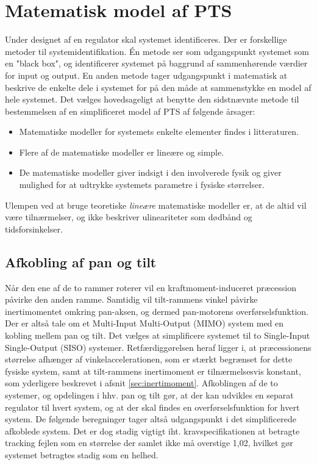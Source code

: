 \section{Matematisk model af PTS}
\label{sec:matPTS}
Under designet af en regulator skal systemet identificeres. Der er forskellige metoder til systemidentifikation.
Én metode ser som udgangspunkt systemet som en "black box", og identificerer systemet
på baggrund af sammenhørende værdier for input og output.
En anden metode tager udgangspunkt i matematisk at beskrive de enkelte dele i systemet
for på den måde at sammenstykke en model af hele systemet.
Det vælges hovedsageligt at benytte den sidstnævnte metode til bestemmelsen af en simplificeret
model af PTS af følgende årsager:
\begin{itemize}
\itemsep1pt
\item Matematiske modeller for systemets enkelte elementer findes i litteraturen.
\item Flere af de matematiske modeller er lineære og simple.
\item De matematiske modeller giver indsigt i den involverede fysik og giver mulighed
	for at udtrykke systemets parametre i fysiske størrelser.
\end{itemize}
Ulempen ved at bruge teoretiske \textit{lineære} matematiske modeller er,
at de altid vil være tilnærmelser, og ikke beskriver ulineariteter som dødbånd og tidsforsinkelser.

\subsection{Afkobling af pan og tilt}
Når den ene af de to rammer roterer vil en kraftmoment-induceret præcession påvirke den anden ramme.
Samtidig vil tilt-rammens vinkel påvirke inertimomentet omkring pan-aksen, og dermed
pan-motorens overførselsfunktion.
Der er altså tale om et Multi-Input Multi-Output (MIMO) system med en kobling mellem pan og tilt.
Det vælges at simplificere systemet til to Single-Input Single-Output (SISO) systemer.%
Retfærdiggørelsen heraf ligger i, at præcessionens størrelse afhænger af vinkelaccelerationen, som er stærkt begrænset
for dette fysiske system, samt at tilt-rammens inertimoment er tilnærmelsesvis konstant, som yderligere beskrevet i afsnit \ref{sec:inertimoment}.
Afkoblingen af de to systemer, og opdelingen i hhv. pan og tilt gør, at der kan udvikles en separat regulator
til hvert system, og at der skal findes en overførselsfunktion for hvert system.
De følgende beregninger tager altså udgangspunkt i det simplificerede afkoblede system.
Det er dog stadig vigtigt iht. kravspecifikationen at betragte tracking fejlen som en størrelse der samlet
ikke må overstige 1,02\degree{}, hvilket gør systemet betragtes stadig som en helhed.

